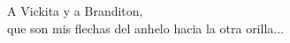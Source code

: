 \begin{dedication}
{\large{A Vickita y a Branditon,}}\\[2mm]
que son mis flechas del anhelo hacia la otra orilla...
\end{dedication}


